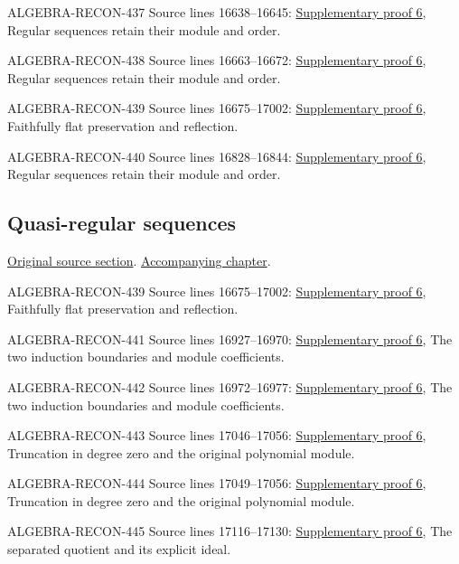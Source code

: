 \begin{AlgebraSourceRoutes}
\item[ALGEBRA-RECON-437] Source lines 16638--16645: \hyperlink{algebra_embedded_regular_notes_20260927}{Supplementary proof 6}, Regular sequences retain their module and order.
\item[ALGEBRA-RECON-438] Source lines 16663--16672: \hyperlink{algebra_embedded_regular_notes_20260927}{Supplementary proof 6}, Regular sequences retain their module and order.
\item[ALGEBRA-RECON-439] Source lines 16675--17002: \hyperlink{algebra_embedded_regular_notes_20260927}{Supplementary proof 6}, Faithfully flat preservation and reflection.
\item[ALGEBRA-RECON-440] Source lines 16828--16844: \hyperlink{algebra_embedded_regular_notes_20260927}{Supplementary proof 6}, Regular sequences retain their module and order.
\end{AlgebraSourceRoutes}

\subsection{Quasi-regular sequences}
\hypertarget{algebra-source-section-quasi-regular}{}
\noindent\href{https://github.com/stacks/stacks-project/blob/a04446e57ec1fbc252a871afcec7752fb2807b14/algebra.tex\#L16855}{Original source section}. \href{algebra.pdf\#nameddest=section-quasi-regular}{Accompanying chapter}.

\begin{AlgebraSourceRoutes}
\item[ALGEBRA-RECON-439] Source lines 16675--17002: \hyperlink{algebra_embedded_regular_notes_20260927}{Supplementary proof 6}, Faithfully flat preservation and reflection.
\item[ALGEBRA-RECON-441] Source lines 16927--16970: \hyperlink{algebra_embedded_regular_notes_20260927}{Supplementary proof 6}, The two induction boundaries and module coefficients.
\item[ALGEBRA-RECON-442] Source lines 16972--16977: \hyperlink{algebra_embedded_regular_notes_20260927}{Supplementary proof 6}, The two induction boundaries and module coefficients.
\item[ALGEBRA-RECON-443] Source lines 17046--17056: \hyperlink{algebra_embedded_regular_notes_20260927}{Supplementary proof 6}, Truncation in degree zero and the original polynomial module.
\item[ALGEBRA-RECON-444] Source lines 17049--17056: \hyperlink{algebra_embedded_regular_notes_20260927}{Supplementary proof 6}, Truncation in degree zero and the original polynomial module.
\item[ALGEBRA-RECON-445] Source lines 17116--17130: \hyperlink{algebra_embedded_regular_notes_20260927}{Supplementary proof 6}, The separated quotient and its explicit ideal.
\end{AlgebraSourceRoutes}

